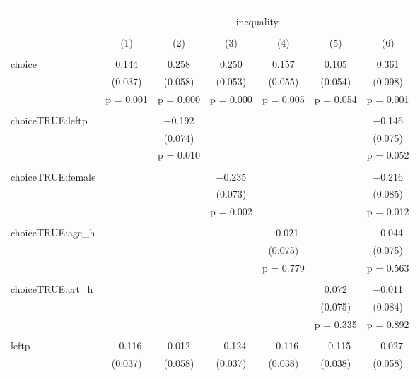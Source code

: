 
\begin{table}[!htbp] \centering 
  \caption{} 
  \label{tbl:l2} 
\begin{tabular}{@{\extracolsep{5pt}}lcccccc} 
\\[-1.8ex]\hline 
\hline \\[-1.8ex] 
\\[-1.8ex] & \multicolumn{6}{c}{inequality} \\ 
\\[-1.8ex] & (1) & (2) & (3) & (4) & (5) & (6)\\ 
\hline \\[-1.8ex] 
 choice & 0.144 & 0.258 & 0.250 & 0.157 & 0.105 & 0.361 \\ 
  & (0.037) & (0.058) & (0.053) & (0.055) & (0.054) & (0.098) \\ 
  & p = 0.001 & p = 0.000 & p = 0.000 & p = 0.005 & p = 0.054 & p = 0.001 \\ 
  & & & & & & \\ 
 choiceTRUE:leftp &  & $-$0.192 &  &  &  & $-$0.146 \\ 
  &  & (0.074) &  &  &  & (0.075) \\ 
  &  & p = 0.010 &  &  &  & p = 0.052 \\ 
  & & & & & & \\ 
 choiceTRUE:female &  &  & $-$0.235 &  &  & $-$0.216 \\ 
  &  &  & (0.073) &  &  & (0.085) \\ 
  &  &  & p = 0.002 &  &  & p = 0.012 \\ 
  & & & & & & \\ 
 choiceTRUE:age\_h &  &  &  & $-$0.021 &  & $-$0.044 \\ 
  &  &  &  & (0.075) &  & (0.075) \\ 
  &  &  &  & p = 0.779 &  & p = 0.563 \\ 
  & & & & & & \\ 
 choiceTRUE:crt\_h &  &  &  &  & 0.072 & $-$0.011 \\ 
  &  &  &  &  & (0.075) & (0.084) \\ 
  &  &  &  &  & p = 0.335 & p = 0.892 \\ 
  & & & & & & \\ 
 leftp & $-$0.116 & 0.012 & $-$0.124 & $-$0.116 & $-$0.115 & $-$0.027 \\ 
  & (0.037) & (0.058) & (0.037) & (0.038) & (0.038) & (0.058) \\ 

\end{tabular}
\end{table}
